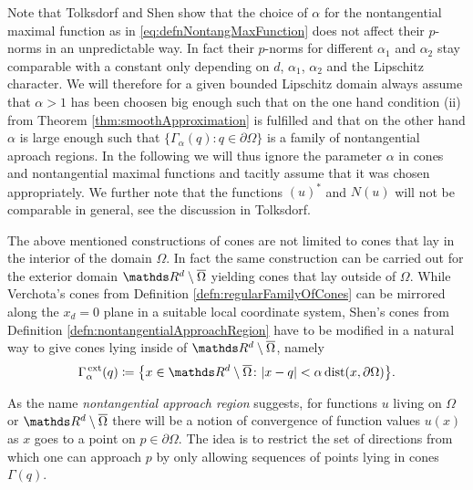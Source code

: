 Note that Tolksdorf \cite{tolksdorf} and Shen \cite{shen2017} show that the choice of $\alpha$ for the nontangential maximal function as in \ref{eq:defnNontangMaxFunction} does not affect their $p$-norms in an unpredictable way. In fact their $p$-norms for different $\alpha_1$ and $\alpha_2$ stay comparable with a constant only depending on $d$, $\alpha_1$, $\alpha_2$ and the Lipschitz character.
We will therefore for a given bounded Lipschitz domain always assume that $\alpha > 1$ has been choosen big enough such that on the one hand condition (ii) from Theorem \ref{thm:smoothApproximation} is fulfilled and that on the other hand $\alpha$ is large enough such that $\{ \Gamma_\alpha(q) \colon q \in \partial\Omega \}$ is a family of nontangential aproach regions.
In the following we will thus ignore the parameter $\alpha$ in cones and nontangential maximal functions and tacitly assume that it was chosen appropriately.
We further note that the functions $(u)^*$ and $N(u)$ will not be comparable in general, see the discussion in Tolksdorf.

The above mentioned constructions of cones are not limited to cones that lay in the interior of the domain $\Omega$.
In fact the same construction can be carried out for the exterior domain $\R^d \setminus \overline{\Omega}$ yielding cones that lay outside of $\Omega$. While Verchota's cones from Definition \ref{defn:regularFamilyOfCones} can be mirrored along the $x_d = 0$ plane in a suitable local coordinate system, Shen's cones from Definition \ref{defn:nontangentialApproachRegion} have to be modified in a natural way to give cones lying inside of $\R^d \setminus \overline \Omega$, namely
\begin{align*}
  \Gamma_\alpha^{\,\mathrm{ext}}(q) \coloneqq \big\{ x \in \R^d \setminus \overline \Omega \colon |x - q| < \alpha \operatorname{dist}(x, \partial\Omega)\big\}.
\end{align*}

As the name \emph{nontangential approach region} suggests, for functions $u$ living on $\Omega$ or $\R^d \setminus \overline\Omega$ there will be a notion of convergence of function values $u(x)$ as $x$ goes to a point on $p \in \partial\Omega$.
The idea is to restrict the set of directions from which one can approach $p$ by only allowing sequences of points lying in cones $\Gamma(q)$.

